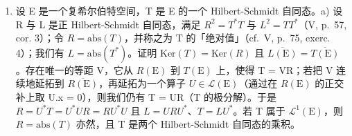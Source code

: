 \begin{enumerate}
\def\labelenumi{\arabic{enumi})}
\setcounter{enumi}{13}
\tightlist
\item
  设 E 是一个复希尔伯特空间，T 是 E 的一个 Hilbert-Schmidt 自同态。a) 设 R 与 L 是正 Hilbert-Schmidt 自同态，满足 \(R^{2} = T^{*}T\) 与 \(L^{2} = TT^{*}\)（V, p.~57, cor. 3）；令 \(R = \text{abs}(T)\)，并称之为 T 的「绝对值」（cf.~V, p.~75, exerc. 4）；我们有 \(L = \text{abs}(T^{*})\)。证明 \(\text{Ker}(T) = \text{Ker}(R)\) 且 \(\overline{L(\text{E})} = \overline{T(\text{E})}\)。存在唯一的等距 V，它从 \(R(\text{E})\) 到 \(T(\text{E})\) 上，使得 T = VR；若把 V 连续地延拓到 \(\overline{R(\text{E})}\)，再延拓为一个算子 \(U \in \mathcal{L}(\text{E})\)（通过在 \(R(\text{E})\) 的正交补上取 U.x = 0），则我们仍有 T = UR（T 的极分解）。于是 \(R = U^{*}T = U^{*}UR = RU^{*}U\) 且 \(L = URU^{*}\)、\(T = LU^{*}\)。若 T 属于 \(\mathcal{L}^{1}(\text{E})\)，则 \(R = \text{abs}(T)\) 亦然，且 T 是两个 Hilbert-Schmidt 自同态的乘积。
\end{enumerate}

